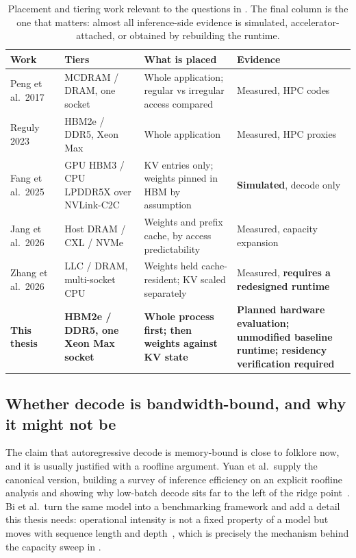 \begin{table}[htbp]
\centering
\small
\tabsetup
\caption{Placement and tiering work relevant to the questions in .  The
final column is the one that matters: almost all inference-side evidence
is simulated, accelerator-attached, or obtained by rebuilding the
runtime.}
\label{tab:lit-tiering}
\begin{tabularx}{\textwidth}{@{}P{2.45cm}P{3.3cm}YP{2.7cm}@{}}
\toprule
\headrow
\textbf{Work} & \textbf{Tiers} & \textbf{What is placed} &
\textbf{Evidence} \\
\midrule
Peng et al.\ 2017~\cite{peng2017hybridmemory}
& MCDRAM / DRAM, one socket
& Whole application; regular vs irregular access compared
& Measured, HPC codes \\
\addlinespace[2pt]
Reguly 2023~\cite{reguly2023xeonmax}
& HBM2e / DDR5, Xeon Max
& Whole application
& Measured, HPC proxies \\
\addlinespace[2pt]
Fang et al.\ 2025~\cite{fang2025kvplacement}
& GPU HBM3 / CPU LPDDR5X over NVLink-C2C
& KV entries only; weights pinned in HBM by assumption
& \textbf{Simulated}, decode only \\
\addlinespace[2pt]
Jang et al.\ 2026~\cite{jang2026itme}
& Host DRAM / CXL / NVMe
& Weights and prefix cache, by access predictability
& Measured, capacity expansion \\
\addlinespace[2pt]
Zhang et al.\ 2026~\cite{zhang2026cacheresident}
& LLC / DRAM, multi-socket CPU
& Weights held cache-resident; KV scaled separately
& Measured, \textbf{requires a redesigned runtime} \\
\addlinespace[2pt]
\textbf{This thesis}
& \textbf{HBM2e / DDR5, one Xeon Max socket}
& \textbf{Whole process first; then weights against KV state}
& \textbf{Planned hardware evaluation; unmodified baseline runtime;
  residency verification required} \\
\bottomrule
\end{tabularx}
\end{table}


\subsection{Whether decode is bandwidth-bound, and why it might not be}
\label{sec:lit-bandwidth}

The claim that autoregressive decode is memory-bound is close to folklore
now, and it is usually justified with a roofline argument.  Yuan et al.\
supply the canonical version, building a survey of inference efficiency
on an explicit roofline analysis and showing why low-batch decode sits
far to the left of the ridge point~\cite{yuan2024roofline}.  Bi et al.\
turn the same model into a benchmarking framework and add a detail this
thesis needs: operational intensity is not a fixed property of a model
but moves with sequence length and depth~\cite{bi2026rooflinebench},
which is precisely the mechanism behind the capacity sweep in
\secref{sec:working-set}.

